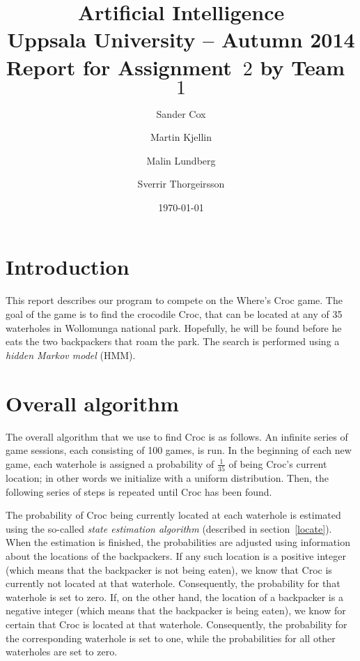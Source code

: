 \documentclass[a4paper]{article}
\title{\textbf{Artificial Intelligence \\
    Uppsala University -- Autumn 2014 \\
    Report for Assignment~$2$
    by Team~$1$
  }
}
\author{Sander Cox \and Martin Kjellin \and Malin Lundberg \and Sverrir
  Thorgeirsson}
\date{\today}
\begin{document}
\maketitle

\section{Introduction}

This report describes our program to compete
on the Where's Croc game. The goal of the game is to find the crocodile Croc,
that can be located at any of 35 waterholes in Wollomunga national
park. Hopefully, he will be found before he eats the two backpackers that roam
the park. The search is performed using a \emph{hidden Markov model}
(HMM).

\section{Overall algorithm}
\label{overall}

The overall algorithm that we use to find Croc is as follows. An infinite series of
game sessions, each consisting of 100 games, is run. In the beginning of each new
game, each waterhole is assigned a probability of $\frac{1}{35}$ of being Croc's
current location; in other words we initialize with a uniform distribution. Then, the
following series of steps is repeated until Croc has been found.

The probability of Croc being currently located at each waterhole is estimated using the so-called \emph{state estimation algorithm} (described in
section~\ref{locate}). %
When the estimation is finished, the probabilities are adjusted using
information about the locations of the backpackers. If any such location is a
positive integer (which means that the backpacker is not being eaten), we know
that Croc is currently not located at that waterhole. Consequently, the
probability for that waterhole is set to zero. If, on the other hand, the
location of a backpacker is a negative integer (which means that the backpacker is
being eaten), we know for certain that Croc is located at that waterhole. Consequently, the
probability for the corresponding waterhole is set to one, while the
probabilities for all other waterholes are set to zero.
\end{document}
